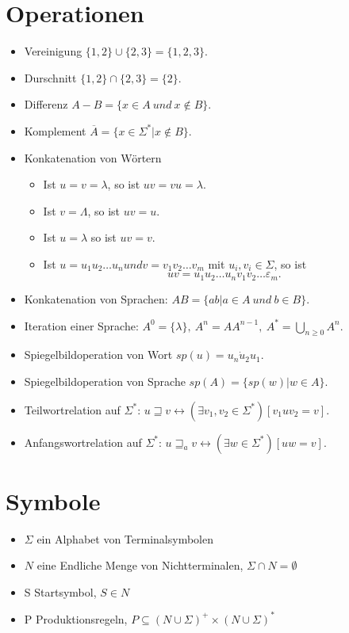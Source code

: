 \documentclass[9pt]{scrartcl}
\begin{document}
\section{Operationen}
\begin{itemize}
	\item Vereinigung $\{1, 2\} \cup \{2, 3\} = \{1, 2, 3\}$.
	\item Durschnitt $\{1, 2\} \cap \{2, 3\} = \{2\}$.
	\item Differenz $A - B = \{x \in A\ und\ x \notin B\}$.
	\item Komplement $\overline{A} = \{x \in \Sigma^*|x\notin B\}$.
	\item Konkatenation von Wörtern
	\begin{itemize}
		\item Ist $u = v = \lambda$, so ist $uv = vu = \lambda$.
		\item Ist $v = \Lambda$, so ist $uv = u$.
		\item Ist $u = \lambda$ so ist $uv = v$.
		\item Ist $u = u_1 u_2 \dots u_n und v = v_1 v_2 \dots v_m $ mit $u_i , v_i \in \Sigma$, so ist
		$$uv = u_1 u_2 \dots u_n v_1 v_2 \dots \varepsilon_m.$$
	\end{itemize}
	\item Konkatenation von Sprachen:
	$AB = \{ab|a\in A \ und\ b \in B\}.$
	\item Iteration einer Sprache:
	$A^0 = \{\lambda\},\ A^n = AA^{n-1},\ A^* = \bigcup_{n\geq 0}A^n$.
	\item Spiegelbildoperation von Wort $sp(u)=u_n \dot u_2 u_1$.
	\item Spiegelbildoperation von Sprache $sp(A)=\{sp(w)|w \in A\}$.
	\item Teilwortrelation auf $\Sigma^*$: 
	 $u \sqsupseteq v \leftrightarrow (\exists v_1, v_2 \in \Sigma^*)[v_1 u v_2 = v]$.
	 \item Anfangswortrelation auf $\Sigma^*$:
	 $ u \sqsupseteq_a v \leftrightarrow (\exists w \in \Sigma^*)[uw = v]$.
\end{itemize}
\section{Symbole}
\begin{itemize}
	\item $\Sigma$ ein Alphabet von Terminalsymbolen
	\item $N$ eine Endliche Menge von Nichtterminalen, $\Sigma \cap N = \emptyset$
	\item S Startsymbol, $S \in N$
	\item P Produktionsregeln, $P \subseteq (N \cup \Sigma)^+ \times (N \cup \Sigma)^*$
\end{itemize}
\end{document}
